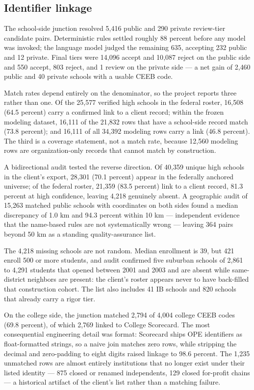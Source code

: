\documentclass[12pt]{article}
\begin{document}
\subsection{Identifier linkage}

The school-side junction resolved 5{,}416 public and 290 private review-tier candidate pairs. Deterministic rules settled roughly 88 percent before any model was invoked; the language model judged the remaining 635, accepting 232 public and 12 private. Final tiers were 14{,}096 accept and 10{,}087 reject on the public side and 550 accept, 803 reject, and 1 review on the private side --- a net gain of 2{,}460 public and 40 private schools with a usable CEEB code.

Match rates depend entirely on the denominator, so the project reports three rather than one. Of the 25{,}577 verified high schools in the federal roster, 16{,}508 (64.5 percent) carry a confirmed link to a client record; within the frozen modeling dataset, 16{,}111 of the 21{,}832 rows that have a school-side record match (73.8 percent); and 16{,}111 of all 34{,}392 modeling rows carry a link (46.8 percent). The third is a coverage statement, not a match rate, because 12{,}560 modeling rows are organization-only records that cannot match by construction.

A bidirectional audit tested the reverse direction. Of 40{,}359 unique high schools in the client's export, 28{,}301 (70.1 percent) appear in the federally anchored universe; of the federal roster, 21{,}359 (83.5 percent) link to a client record, 81.3 percent at high confidence, leaving 4{,}218 genuinely absent. A geographic audit of 15{,}263 matched public schools with coordinates on both sides found a median discrepancy of 1.0 km and 94.3 percent within 10 km --- independent evidence that the name-based rules are not systematically wrong --- leaving 364 pairs beyond 50 km as a standing quality-assurance list.

The 4{,}218 missing schools are not random. Median enrollment is 39, but 421 enroll 500 or more students, and audit confirmed five suburban schools of 2{,}861 to 4{,}291 students that opened between 2001 and 2003 and are absent while same-district neighbors are present: the client's roster appears never to have back-filled that construction cohort. The list also includes 41 IB schools and 820 schools that already carry a rigor tier.

On the college side, the junction matched 2{,}794 of 4{,}004 college CEEB codes (69.8 percent), of which 2{,}769 linked to College Scorecard. The most consequential engineering detail was format: Scorecard ships OPE identifiers as float-formatted strings, so a naive join matches zero rows, while stripping the decimal and zero-padding to eight digits raised linkage to 98.6 percent. The 1{,}235 unmatched rows are almost entirely institutions that no longer exist under their listed identity --- 875 closed or renamed independents, 129 closed for-profit chains --- a historical artifact of the client's list rather than a matching failure.
\end{document}
